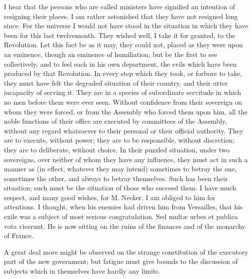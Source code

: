 I hear that the persons who are called ministers have signified an intention of resigning their places. I am rather astonished that they have not resigned long since. For the universe I would not have stood in the situation in which they have been for this last twelvemonth. They wished well, I take it for granted, to the Revolution. Let this fact be as it may, they could not, placed as they were upon an eminence, though an eminence of humiliation, but be the first to see collectively, and to feel each in his own department, the evils which have been produced by that Revolution. In every step which they took, or forbore to take, they must have felt the degraded situation of their country, and their utter incapacity of serving it. They are in a species of subordinate servitude in which no men before them were ever seen. Without confidence from their sovereign on whom they were forced, or from the Assembly who forced them upon him, all the noble functions of their office are executed by committees of the Assembly, without any regard whatsoever to their personal or their official authority. They are to execute, without power; they are to be responsible, without discretion; they are to deliberate, without choice. In their puzzled situation, under two sovereigns, over neither of whom they have any influence, they must act in such a manner as (in effect, whatever they may intend) sometimes to betray the one, sometimes the other, and always to betray themselves. Such has been their situation; such must be the situation of those who succeed them. I have much respect, and many good wishes, for M. Necker. I am obliged to him for attentions. I thought, when his enemies had driven him from Versailles, that his exile was a subject of most serious congratulation. Sed multæ urbes et publica vota vicerunt. He is now sitting on the ruins of the finances and of the monarchy of France.

A great deal more might be observed on the strange constitution of the executory part of the new government; but fatigue must give bounds to the discussion of subjects which in themselves have hardly any limits.

